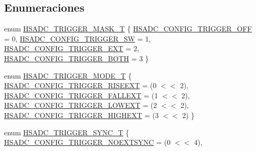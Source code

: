 \subsection*{Enumeraciones}
\begin{DoxyCompactItemize}
\item 
enum \hyperlink{group___h_s_a_d_c__18_x_x__43_x_x_gabacdffe94b42f1dc1c339dab9a20772c}{H\+S\+A\+D\+C\+\_\+\+T\+R\+I\+G\+G\+E\+R\+\_\+\+M\+A\+S\+K\+\_\+T} \{ \hyperlink{group___h_s_a_d_c__18_x_x__43_x_x_ggabacdffe94b42f1dc1c339dab9a20772caacc058b469367e54d9cb0b79c893c27b}{H\+S\+A\+D\+C\+\_\+\+C\+O\+N\+F\+I\+G\+\_\+\+T\+R\+I\+G\+G\+E\+R\+\_\+\+O\+FF} = 0, 
\hyperlink{group___h_s_a_d_c__18_x_x__43_x_x_ggabacdffe94b42f1dc1c339dab9a20772ca60a0ed78169b3ca42913125055400dd1}{H\+S\+A\+D\+C\+\_\+\+C\+O\+N\+F\+I\+G\+\_\+\+T\+R\+I\+G\+G\+E\+R\+\_\+\+SW} = 1, 
\hyperlink{group___h_s_a_d_c__18_x_x__43_x_x_ggabacdffe94b42f1dc1c339dab9a20772caa757019f18616753839c7817d7e633d9}{H\+S\+A\+D\+C\+\_\+\+C\+O\+N\+F\+I\+G\+\_\+\+T\+R\+I\+G\+G\+E\+R\+\_\+\+E\+XT} = 2, 
\hyperlink{group___h_s_a_d_c__18_x_x__43_x_x_ggabacdffe94b42f1dc1c339dab9a20772ca565a4a6ef822ca662af662b13d06c4b9}{H\+S\+A\+D\+C\+\_\+\+C\+O\+N\+F\+I\+G\+\_\+\+T\+R\+I\+G\+G\+E\+R\+\_\+\+B\+O\+TH} = 3
 \}
\item 
enum \hyperlink{group___h_s_a_d_c__18_x_x__43_x_x_gab4aa68023c03604cc1333eed859073e9}{H\+S\+A\+D\+C\+\_\+\+T\+R\+I\+G\+G\+E\+R\+\_\+\+M\+O\+D\+E\+\_\+T} \{ \hyperlink{group___h_s_a_d_c__18_x_x__43_x_x_ggab4aa68023c03604cc1333eed859073e9ad7129b13b7955c2995a91774947869f2}{H\+S\+A\+D\+C\+\_\+\+C\+O\+N\+F\+I\+G\+\_\+\+T\+R\+I\+G\+G\+E\+R\+\_\+\+R\+I\+S\+E\+E\+XT} = (0 $<$$<$ 2), 
\hyperlink{group___h_s_a_d_c__18_x_x__43_x_x_ggab4aa68023c03604cc1333eed859073e9ac157643a91f076c5864d316234f72c0f}{H\+S\+A\+D\+C\+\_\+\+C\+O\+N\+F\+I\+G\+\_\+\+T\+R\+I\+G\+G\+E\+R\+\_\+\+F\+A\+L\+L\+E\+XT} = (1 $<$$<$ 2), 
\hyperlink{group___h_s_a_d_c__18_x_x__43_x_x_ggab4aa68023c03604cc1333eed859073e9a15370950a068bae8a811f325302e2afe}{H\+S\+A\+D\+C\+\_\+\+C\+O\+N\+F\+I\+G\+\_\+\+T\+R\+I\+G\+G\+E\+R\+\_\+\+L\+O\+W\+E\+XT} = (2 $<$$<$ 2), 
\hyperlink{group___h_s_a_d_c__18_x_x__43_x_x_ggab4aa68023c03604cc1333eed859073e9acdf358d24d8f8407d365a01f7a671419}{H\+S\+A\+D\+C\+\_\+\+C\+O\+N\+F\+I\+G\+\_\+\+T\+R\+I\+G\+G\+E\+R\+\_\+\+H\+I\+G\+H\+E\+XT} = (3 $<$$<$ 2)
 \}
\item 
enum \hyperlink{group___h_s_a_d_c__18_x_x__43_x_x_ga2b37f3b76e8523e0035f2b275ddb36ce}{H\+S\+A\+D\+C\+\_\+\+T\+R\+I\+G\+G\+E\+R\+\_\+\+S\+Y\+N\+C\+\_\+T} \{ \hyperlink{group___h_s_a_d_c__18_x_x__43_x_x_gga2b37f3b76e8523e0035f2b275ddb36ceae6d8612bb563af3ba4e3a484208a0f1f}{H\+S\+A\+D\+C\+\_\+\+C\+O\+N\+F\+I\+G\+\_\+\+T\+R\+I\+G\+G\+E\+R\+\_\+\+N\+O\+E\+X\+T\+S\+Y\+NC} = (0 $<$$<$ 4), 
$$
\end{DoxyCompactItemize}
